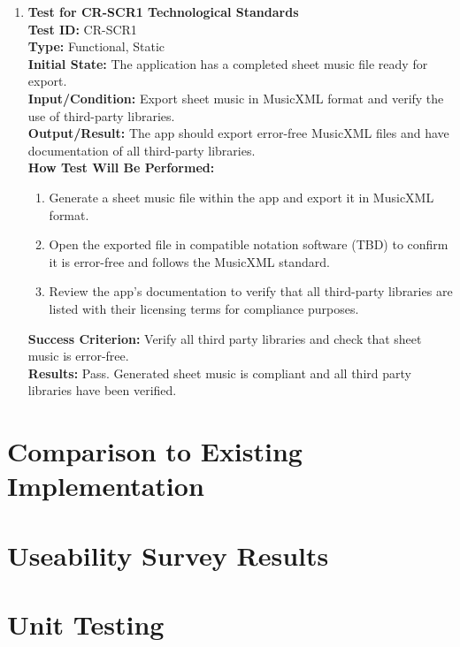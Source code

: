 \documentclass[12pt, titlepage]{article}
\begin{document}
\begin{enumerate}
    \item \textbf{Test for CR-SCR1 Technological Standards} \\
      \newline
      \textbf{Test ID:} CR-SCR1 \\
      \textbf{Type:} Functional, Static \\
      \textbf{Initial State:} The application has a completed sheet music file ready for export. \\
      \textbf{Input/Condition:} Export sheet music in MusicXML format and verify the use of third-party libraries. \\
      \textbf{Output/Result:} The app should export error-free MusicXML files and have documentation of all third-party libraries. \\
      \textbf{How Test Will Be Performed:}
      \begin{enumerate}
          \item Generate a sheet music file within the app and export it in MusicXML format.
          \item Open the exported file in compatible notation software (TBD) to confirm it is error-free and follows the 
          MusicXML standard.
          \item Review the app’s documentation to verify that all third-party libraries are listed with their licensing 
          terms for compliance purposes.
      \end{enumerate}
      \textbf{Success Criterion:} Verify all third party libraries and check that sheet music is error-free.\\
      \textbf{Results:} Pass. Generated sheet music is compliant and all third party libraries have been verified.\\
\end{enumerate}
	
\section{Comparison to Existing Implementation}	

\section{Useability Survey Results}

\section{Unit Testing}
\end{document}
